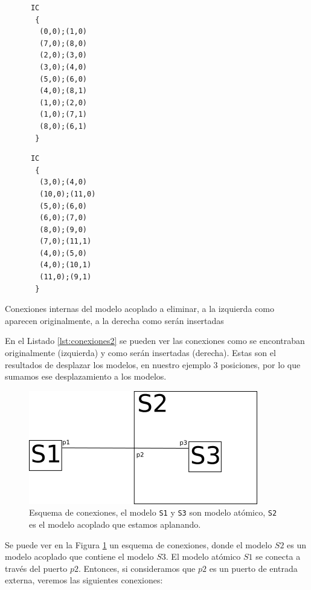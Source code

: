 \begin{itemize}
\begin{listing}[H]
\begin{minipage}[t]{0.5\textwidth}
\begin{verbatim}
      IC
       {
        (0,0);(1,0)
        (7,0);(8,0)
        (2,0);(3,0)
        (3,0);(4,0)
        (5,0);(6,0)
        (4,0);(8,1)
        (1,0);(2,0)
        (1,0);(7,1)
        (8,0);(6,1)
       }
\end{verbatim}
        \end{minipage}
        \begin{minipage}[t]{0.5\textwidth}
\begin{verbatim}
      IC
       {
        (3,0);(4,0)
        (10,0);(11,0)
        (5,0);(6,0)
        (6,0);(7,0)
        (8,0);(9,0)
        (7,0);(11,1)
        (4,0);(5,0)
        (4,0);(10,1)
        (11,0);(9,1)
       }
\end{verbatim}
        \end{minipage}
        \caption{Conexiones internas del modelo acoplado a eliminar, a la izquierda como aparecen originalmente, a la derecha como serán insertadas}\label{lst:conexiones2}
\end{listing}

        En el Listado \ref{lst:conexiones2} se pueden ver las conexiones como se encontraban originalmente (izquierda) y como serán insertadas (derecha).
        Estas son el resultados de desplazar los modelos, en nuestro ejemplo $3$ posiciones, por lo que sumamos ese desplazamiento a los modelos.

\begin{figure}[H]
\centering
\includegraphics[width=.75\textwidth]{text3418}
\caption{Esquema de conexiones, el modelo \texttt{S1} y \texttt{S3} son modelo atómico, \texttt{S2} es el modelo acoplado que estamos aplanando.} \label{fig:aplanado-ports}
\end{figure}

	Se puede ver en la Figura \ref{fig:aplanado-ports} un esquema de conexiones, donde el modelo $S2$ es un modelo acoplado que contiene el modelo $S3$.
	 El modelo atómico $S1$ se conecta a través del puerto $p2$.
	 Entonces, si consideramos que $p2$ es un puerto de entrada externa, veremos las siguientes conexiones:


\end{itemize}

